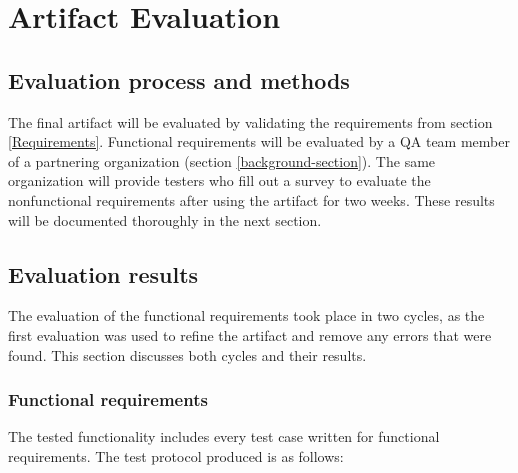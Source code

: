 
\chapter{Artifact Evaluation} 

\label{Chapter6} 

\section{Evaluation process and methods}

The final artifact will be evaluated by validating the requirements from section \ref{Requirements}. 
Functional requirements will be evaluated by a QA team member of a partnering organization (section \ref{background-section}).
The same organization will provide testers who fill out a survey to evaluate the nonfunctional requirements after using the artifact for two weeks. 
These results will be documented thoroughly in the next section.

\section{Evaluation results}

The evaluation of the functional requirements took place in two cycles, as the first evaluation was used to refine the artifact and remove any errors that were found. 
This section discusses both cycles and their results.

\subsection{Functional requirements}

The tested functionality includes every test case written for functional requirements. 
The test protocol produced is as follows:

